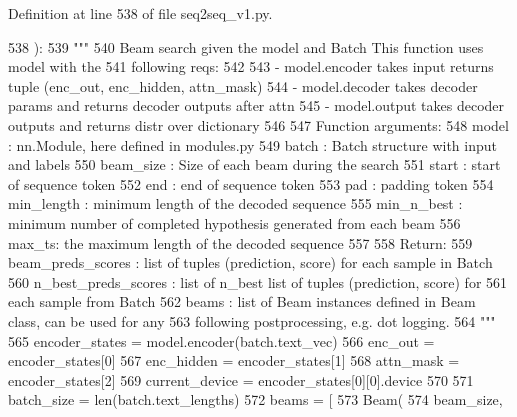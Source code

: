 Definition at line 538 of file seq2seq\+\_\+v1.\+py.


\begin{DoxyCode}
538     ):
539         \textcolor{stringliteral}{"""}
540 \textcolor{stringliteral}{        Beam search given the model and Batch This function uses model with the}
541 \textcolor{stringliteral}{        following reqs:}
542 \textcolor{stringliteral}{}
543 \textcolor{stringliteral}{        - model.encoder takes input returns tuple (enc\_out, enc\_hidden, attn\_mask)}
544 \textcolor{stringliteral}{        - model.decoder takes decoder params and returns decoder outputs after attn}
545 \textcolor{stringliteral}{        - model.output takes decoder outputs and returns distr over dictionary}
546 \textcolor{stringliteral}{}
547 \textcolor{stringliteral}{        Function arguments:}
548 \textcolor{stringliteral}{        model : nn.Module, here defined in modules.py}
549 \textcolor{stringliteral}{        batch : Batch structure with input and labels}
550 \textcolor{stringliteral}{        beam\_size : Size of each beam during the search}
551 \textcolor{stringliteral}{        start : start of sequence token}
552 \textcolor{stringliteral}{        end : end of sequence token}
553 \textcolor{stringliteral}{        pad : padding token}
554 \textcolor{stringliteral}{        min\_length : minimum length of the decoded sequence}
555 \textcolor{stringliteral}{        min\_n\_best : minimum number of completed hypothesis generated from each beam}
556 \textcolor{stringliteral}{        max\_ts: the maximum length of the decoded sequence}
557 \textcolor{stringliteral}{}
558 \textcolor{stringliteral}{        Return:}
559 \textcolor{stringliteral}{        beam\_preds\_scores : list of tuples (prediction, score) for each sample in Batch}
560 \textcolor{stringliteral}{        n\_best\_preds\_scores : list of n\_best list of tuples (prediction, score) for}
561 \textcolor{stringliteral}{                              each sample from Batch}
562 \textcolor{stringliteral}{        beams : list of Beam instances defined in Beam class, can be used for any}
563 \textcolor{stringliteral}{                following postprocessing, e.g. dot logging.}
564 \textcolor{stringliteral}{        """}
565         encoder\_states = model.encoder(batch.text\_vec)
566         enc\_out = encoder\_states[0]
567         enc\_hidden = encoder\_states[1]
568         attn\_mask = encoder\_states[2]
569         current\_device = encoder\_states[0][0].device
570 
571         batch\_size = len(batch.text\_lengths)
572         beams = [
573             Beam(
574                 beam\_size,

\end{DoxyCode}
